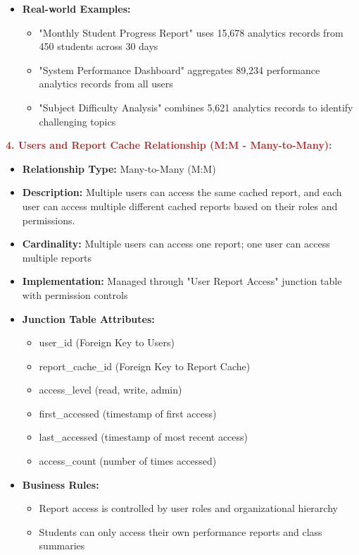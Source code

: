 \documentclass[12pt,a4paper,oneside]{book}
\begin{document}
\begin{itemize}
    \item \textbf{Real-world Examples:}
        \begin{itemize}
            \item "Monthly Student Progress Report" uses 15,678 analytics records from 450 students across 30 days
            \item "System Performance Dashboard" aggregates 89,234 performance analytics records from all users
            \item "Subject Difficulty Analysis" combines 5,621 analytics records to identify challenging topics
        \end{itemize}
\end{itemize}

\textbf{\textcolor{brown}{4. Users and Report Cache Relationship (M:M - Many-to-Many):}}
\begin{itemize}
    \item \textbf{Relationship Type:} Many-to-Many (M:M)
    \item \textbf{Description:} Multiple users can access the same cached report, and each user can access multiple different cached reports based on their roles and permissions.
    \item \textbf{Cardinality:} Multiple users can access one report; one user can access multiple reports
    \item \textbf{Implementation:} Managed through "User Report Access" junction table with permission controls
    \item \textbf{Junction Table Attributes:}
        \begin{itemize}
            \item user\_id (Foreign Key to Users)
            \item report\_cache\_id (Foreign Key to Report Cache)
            \item access\_level (read, write, admin)
            \item first\_accessed (timestamp of first access)
            \item last\_accessed (timestamp of most recent access)
            \item access\_count (number of times accessed)
        \end{itemize}
    \item \textbf{Business Rules:}
        \begin{itemize}
            \item Report access is controlled by user roles and organizational hierarchy
            \item Students can only access their own performance reports and class summaries

\end{itemize}
\end{itemize}
\end{document}
